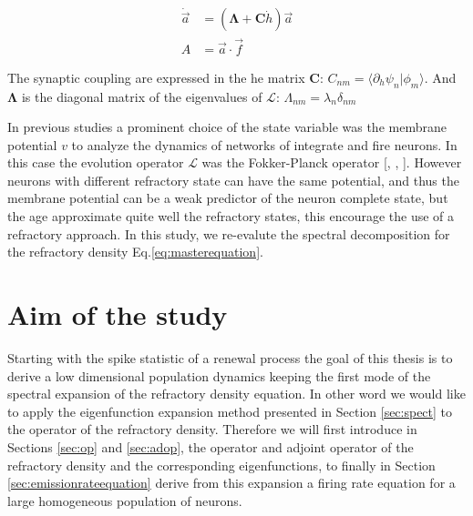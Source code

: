 \documentclass[12pt,twoside]{report}
\begin{document}
\begin{align}
\dot{\vec{a}}&=(\boldsymbol{\Lambda}+\boldsymbol{C}\dot{h})\vec{a}\\
A&=\vec{a}\cdot\vec{f}
\end{align}


The synaptic coupling are expressed in the he matrix $\boldsymbol{C}$: $C_{nm}=\langle\partial_h\psi_n|\phi_m\rangle$. And $\boldsymbol{\Lambda}$ is the diagonal matrix of the eigenvalues of $\mathcal{L}$:  $\Lambda_{nm}=\lambda_n\delta_{nm}$




 In previous studies a prominent choice of the state variable was the membrane potential $v$ to analyze the dynamics of networks of integrate and fire neurons.  In this case the evolution operator $\mathcal{L}$ was the Fokker-Planck operator [\cite{MatGiu02}, \cite{GerKis02}, \cite{SchOst13}]. However neurons with different refractory state can have the same potential, and thus the membrane potential can be a weak predictor of the neuron complete state, but the age approximate quite well the refractory states, this encourage the use of a refractory approach. In this study, we re-evalute the spectral decomposition for the refractory density Eq.\eqref{eq:masterequation}. 


\section{Aim of the study}


Starting with the spike statistic of a renewal process the goal of this thesis is to derive a low dimensional population dynamics keeping the first mode of the spectral expansion of the refractory density equation. In other word we would like to apply the eigenfunction expansion method presented in Section \ref{sec:spect} to the operator of the refractory density. Therefore we will first introduce in Sections \ref{sec:op} and \ref{sec:adop}, the operator and adjoint operator of the refractory density and the corresponding eigenfunctions, to finally  in Section \ref{sec:emissionrateequation} derive from this expansion a firing rate equation for a large homogeneous population of neurons. 
\end{document}
